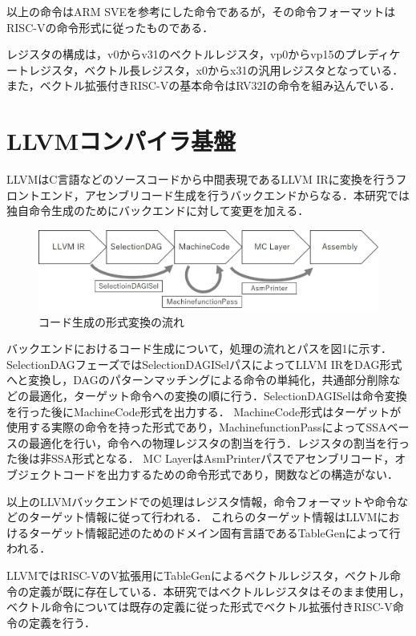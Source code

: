 \documentclass[a4paper,9pt, twocolumn]{jarticle}
\begin{document}
以上の命令はARM SVEを参考にした命令であるが，その命令フォーマットはRISC-Vの命令形式に従ったものである．

レジスタの構成は，v0からv31のベクトルレジスタ，vp0からvp15のプレディケートレジスタ，ベクトル長レジスタ，x0からx31の汎用レジスタとなっている．
また，ベクトル拡張付きRISC-Vの基本命令はRV32Iの命令を組み込んでいる．

\section{LLVMコンパイラ基盤}
LLVMはC言語などのソースコードから中間表現であるLLVM IRに変換を行うフロントエンド，アセンブリコード生成を行うバックエンドからなる．本研究では独自命令生成のためにバックエンドに対して変更を加える．

\begin{figure}[H]
    \begin{center}
        \includegraphics[scale=0.3]{backend.eps}
    \end{center}
    \caption{コード生成の形式変換の流れ}
    \label{fig:backend}
\end{figure}

バックエンドにおけるコード生成について，処理の流れとパスを図1に示す．
SelectionDAGフェーズではSelectionDAGISelパスによってLLVM IRをDAG形式へと変換し，DAGのパターンマッチングによる命令の単純化，共通部分削除などの最適化，ターゲット命令への変換の順に行う．SelectionDAGISelは命令変換を行った後にMachineCode形式を出力する．
MachineCode形式はターゲットが使用する実際の命令を持った形式であり，MachinefunctionPassによってSSAベースの最適化を行い，命令への物理レジスタの割当を行う．レジスタの割当を行った後は非SSA形式となる．
MC LayerはAsmPrinterパスでアセンブリコード，オブジェクトコードを出力するための命令形式であり，関数などの構造がない．

以上のLLVMバックエンドでの処理はレジスタ情報，命令フォーマットや命令などのターゲット情報に従って行われる．
これらのターゲット情報はLLVMにおけるターゲット情報記述のためのドメイン固有言語であるTableGenによって行われる．

LLVMではRISC-VのV拡張用にTableGenによるベクトルレジスタ，ベクトル命令の定義が既に存在している．本研究ではベクトルレジスタはそのまま使用し，ベクトル命令については既存の定義に従った形式でベクトル拡張付きRISC-V命令の定義を行う．
\end{document}
